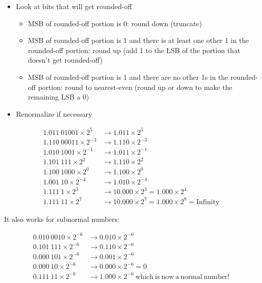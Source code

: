 \documentclass{article}
\begin{document}
\begin{itemize}
\item Look at bits that will get rounded-off
    \begin{itemize}
    \item MSB of rounded-off portion is 0: round down (truncate)
    \item MSB of rounded-off portion is 1 and there is at least one other 1 in
        the rounded-off portion: round up (add 1 to the LSB of the portion that
        doesn't get rounded-off)
    \item MSB of rounded-off portion is 1 and there are no other 1s in the
        rounded-off portion: round to nearest-even (round up or down to make
        the remaining LSB a 0)
    \end{itemize}
\item Renormalize if necessary
\end{itemize}

\begin{align*}
1.011\ 01001 \times 2^5     & \rightarrow 1.011 \times 2^5 \\
1.110\ 00011 \times 2^{-3}  & \rightarrow 1.110 \times 2^{-3} \\
1.010\ 1001 \times 2^{-1}   & \rightarrow 1.011 \times 2^{-1} \\
1.101\ 111 \times 2^{2}     & \rightarrow 1.110 \times 2^2 \\
1.100\ 1000 \times 2^{0}    & \rightarrow 1.100 \times 2^{0} \\
1.001\ 10 \times 2^{-4}     & \rightarrow 1.010 \times 2^{-4} \\
1.111\ 1 \times 2^{3}       & \rightarrow 10.000 \times 2^{3} = 1.000 \times 2^{4} \\
1.111\ 11 \times 2^7        & \rightarrow 10.000 \times 2^7 = 1.000 \times 2^8 = \mathrm{Infinity}
\end{align*}

It also works for subnormal numbers:

\begin{align*}
0.010\ 0010 \times 2^{-6}   & \rightarrow 0.010 \times 2^{-6} \\
0.101\ 111 \times 2^{-6}    & \rightarrow 0.110 \times 2^{-6} \\
0.000\ 101 \times 2^{-6}    & \rightarrow 0.001 \times 2^{-6} \\
0.000\ 10 \times 2^{-6}     & \rightarrow 0.000 \times 2^{-6} = 0 \\
0.111\ 11 \times 2^{-6}     & \rightarrow 1.000 \times 2^{-6}\ \mathrm{which\ is\ now\ a\ normal\ number!}
\end{align*}
\end{document}
